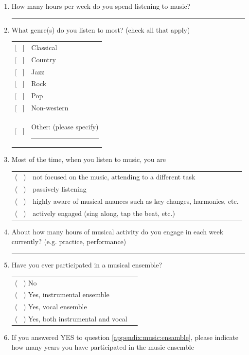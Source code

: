 \documentclass[a4paper,11pt]{article}
\newcommand{\myunderline}{\rule{2in}{.5pt}}
\begin{document}
{\begin{appendices}
\begin{enumerate}[resume]
	\item How many hours per week do you spend listening to music?

	\myunderline

	\item What genre(s) do you listen to most? (check all that apply)

	\begin{tabular}{l l}
		{[{ \ }]} & Classical \\
		{[{ \ }]} & Country \\
		{[{ \ }]} & Jazz \\
		{[{ \ }]} & Rock \\
		{[{ \ }]} & Pop \\
		{[{ \ }]} & Non-western \\
		{[{ \ }]} & Other: (please specify) \myunderline \\
	\end{tabular}

	\item Most of the time, when you listen to music, you are

	\begin{tabular}{l l}
		( \ ) & not focused on the music, attending to a different task \\
		( \ ) & passively listening \\
		( \ ) & highly aware of musical nuances such as key changes, harmonies, etc. \\
		( \ ) & actively engaged (sing along, tap the beat, etc.) \\
	\end{tabular}

	\item About how many hours of musical activity do you engage in each week currently? (e.g. practice, performance)

	\myunderline

	\item \label{appendix:music:ensamble}Have you ever participated in a musical ensemble?

	\begin{tabular}{l l}
		( \ ) No \\
		( \ ) Yes, instrumental ensemble \\
		( \ ) Yes, vocal ensemble \\
		( \ ) Yes, both instrumental and vocal \\
	\end{tabular}

	\item If you answered YES to question \ref{appendix:music:ensamble}, please indicate how many years you have participated in the music ensemble


\end{enumerate}
\end{appendices}}
\end{document}
